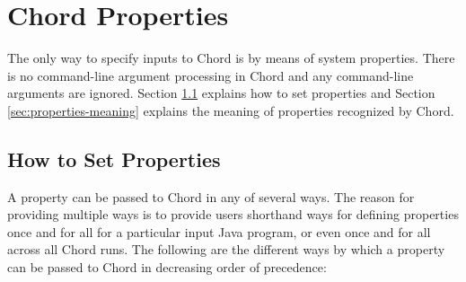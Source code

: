 \chapter{Chord Properties}
\label{chap:properties}

The only way to specify inputs to Chord is by means of system properties.
There is no command-line argument processing in Chord and any command-line arguments are ignored.
Section \ref{sec:properties-setting} explains how to set properties and
Section \ref{sec:properties-meaning} explains the meaning of properties recognized by Chord.

\section{How to Set Properties}
\label{sec:properties-setting}

A property can be passed to Chord in any of several ways.
The reason for providing multiple ways is to provide users shorthand ways for defining properties
once and for all for a particular input Java program, or even once and for all across all Chord runs. 
The following are the different ways by which a property can be passed to Chord in decreasing order of precedence:


